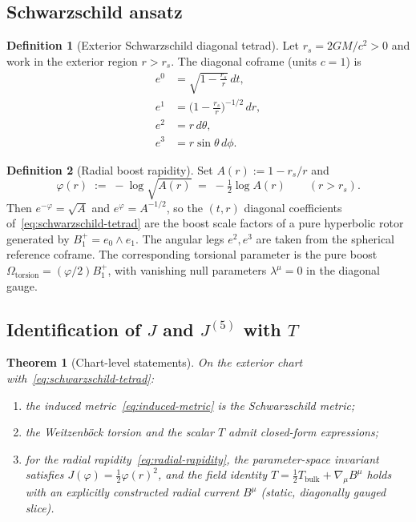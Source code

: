 \documentclass[dvipdfmx,a4paper]{article}
\theoremstyle{definition}
\newtheorem{definition}{Definition}
\theoremstyle{plain}
\newtheorem{theorem}{Theorem}
\theoremstyle{remark}
\begin{document}
\subsection{Schwarzschild ansatz}

\begin{definition}[Exterior Schwarzschild diagonal tetrad]
Let \(r_{s}=2GM/c^{2}>0\) and work in the exterior region \(r>r_{s}\). The diagonal coframe (units \(c=1\)) is
\begin{align}
e^{0} &= \sqrt{1-\frac{r_{s}}{r}}\,dt,\nonumber\\
e^{1} &= \bigl(1-\frac{r_{s}}{r}\bigr)^{-1/2}\,dr,\nonumber\\
e^{2} &= r\,d\theta,\nonumber\\
e^{3} &= r\sin\theta\,d\phi.
\label{eq:schwarzschild-tetrad}
\end{align}
\end{definition}

\begin{definition}[Radial boost rapidity]
Set \(A(r):=1-r_{s}/r\) and
\begin{equation}
\varphi(r) \;:=\; -\log\sqrt{A(r)} \;=\; -\tfrac12\log A(r)
\qquad(r>r_{s}).
\label{eq:radial-rapidity}
\end{equation}
Then \(e^{-\varphi}=\sqrt{A}\) and \(e^{\varphi}=A^{-1/2}\), so the \((t,r)\) diagonal coefficients of~\eqref{eq:schwarzschild-tetrad} are the boost scale factors of a pure hyperbolic rotor generated by \(B^{+}_{1}=e_{0}\wedge e_{1}\). The angular legs \(e^{2},e^{3}\) are taken from the spherical reference coframe. The corresponding torsional parameter is the pure boost \(\Omega_{\mathrm{torsion}}=(\varphi/2)B^{+}_{1}\), with vanishing null parameters \(\lambda^{\mu}=0\) in the diagonal gauge.
\end{definition}

\subsection{Identification of \(J\) and \(J^{(5)}\) with \(T\)}

\begin{theorem}[Chart-level statements]
On the exterior chart with~\eqref{eq:schwarzschild-tetrad}:
\begin{enumerate}
\item the induced metric~\eqref{eq:induced-metric} is the Schwarzschild metric;
\item the Weitzenb\"{o}ck torsion and the scalar \(T\) admit closed-form expressions;
\item for the radial rapidity~\eqref{eq:radial-rapidity}, the parameter-space invariant satisfies
\(J(\varphi)=\tfrac12\varphi(r)^{2}\), and the field identity
\(T=\tfrac12 T_{\mathrm{bulk}}+ \nabla_{\mu}B^{\mu}\)
holds with an explicitly constructed radial current \(B^{\mu}\) (static, diagonally gauged slice).
\end{enumerate}
\end{theorem}
\end{document}
